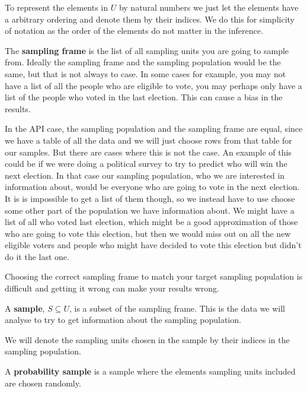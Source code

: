 \documentclass{article}
\begin{document}
To represent the elements in \(U\) by natural numbers we just let the elements
have a arbitrary ordering and denote them by their indices. We do this for
simplicity of notation as the order of the elements do not matter in the inference.

\begin{definition} \label{def:sampFrame}
The \textbf{sampling frame} is the list of all sampling units you are going to sample from. Ideally the sampling frame and the sampling population would be the same, but that is not always to case. In some cases for example, you may not have a list of all the people who are eligible to vote, you may perhaps only have a list of the people who voted in the last election. This can cause a bias in the results.
\end{definition}

In the API case, the sampling population and the sampling frame are equal, since
we have a table of all the data and we will just choose rows from that table for
our samples. But there are cases where this is not the case. An example of this
could be if we were doing a political survey to try to predict who will win the
next election.
In that case our sampling population, who we are interested in information
about, would be everyone who are going to vote in the next election. It is
is impossible to get a list of them though, so we instead have to use choose
some other part of the population we have information about. We might have a
list of all who voted last election, which might be a good approximation of
those who are going to vote this election, but then we would miss out on all the
new eligible voters and people who might have decided to vote this election but
didn't do it the last one.

Choosing the correct sampling frame to match your target sampling population is
difficult and getting it wrong can make your results wrong.


\begin{definition} \label{def:sample}
A \textbf{sample}, \(S \subseteq U\), is a subset of the sampling frame. This is the data we will analyse to try to get information about the sampling population.
\end{definition}

We will denote the sampling units chosen in the sample by their indices in the
sampling population.

\begin{definition} \label{def:probSample}
A \textbf{probability sample} is a sample where the elements sampling units included are chosen randomly.
\end{definition}
\end{document}
